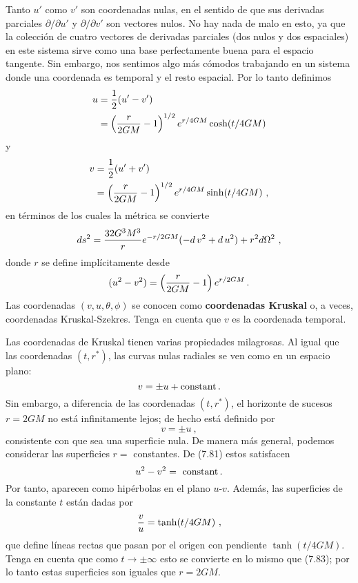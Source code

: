 \documentclass[11pt,b5paper,openany,twoside]{book}
\begin{document}
Tanto $u'$ como $v'$ son coordenadas nulas, en el sentido de que sus derivadas parciales $\partial/\partial u'$ y $\partial/\partial v'$ son vectores nulos.
No hay nada de malo en esto, ya que la colección de cuatro vectores de derivadas parciales (dos nulos y dos espaciales) en este sistema sirve como una base perfectamente buena para el espacio tangente.
Sin embargo, nos sentimos algo más cómodos trabajando en un sistema donde una coordenada es temporal y el resto espacial.
Por lo tanto definimos
\begin{align}
u  &=  {1\over 2}(u'-v') \notag \\
&=  \left({{r}\over{2GM}}-1\right)^{1/2}e^{r/4GM}\cosh(t/4GM)
\label{7.78}
\end{align}
y
\begin{align}
v  &=  {1\over 2}(u'+v') \notag \\
&=  \left({{r}\over{2GM}}-1\right)^{1/2}e^{r/4GM}\sinh(t/4GM)\ ,
\label{7.79}
\end{align}
en términos de los cuales la métrica se convierte
\begin{equation}
ds^2 ={{32 G^3M^3}\over{r}}e^{-r/2GM}(- d\,v^2+ d\,u^2)
+r^2 d\Omega^2\ ,\label{7.80}
\end{equation}
donde $r$ se define implícitamente desde
\begin{equation}
(u^2-v^2)=
\left({{r}\over{2GM}}-1\right)e^{r/2GM}\,.\label{7.81}
\end{equation}
Las coordenadas $(v,u,\theta,\phi)$ se conocen como {\bf coordenadas Kruskal} o, a veces, coordenadas Kruskal-Szekres.
Tenga en cuenta que $v$ es la coordenada temporal.

Las coordenadas de Kruskal tienen varias propiedades milagrosas.
Al igual que las coordenadas $(t,r^*)$, las curvas nulas radiales se ven como en un espacio plano:
\begin{equation}
v= \pm u + {\rm constant}\,.\label{7.82}
\end{equation}
Sin embargo, a diferencia de las coordenadas $(t,r^*)$, el horizonte de sucesos $r=2GM$ no está infinitamente lejos; de hecho está definido por
\begin{equation}
v = \pm u\ ,\label{7.83}
\end{equation}
consistente con que sea una superficie nula.
De manera más general, podemos considerar las superficies $r=$ constantes.
De (7.81) estos satisfacen
\begin{equation}
u^2-v^2 = {\rm ~constant}\,.\label{7.84}
\end{equation}
Por tanto, aparecen como hipérbolas en el plano $u$-$v$.
Además, las superficies de la constante $t$ están dadas por
\begin{equation}
{v\over u} = \tanh(t/4GM)\ ,\label{7.85}
\end{equation}
que define líneas rectas que pasan por el origen con pendiente $\tanh(t/4GM)$.
Tenga en cuenta que como $t\rightarrow \pm\infty$ esto se convierte en lo mismo que (7.83); por lo tanto estas superficies son iguales que $r=2GM$.
\end{document}
